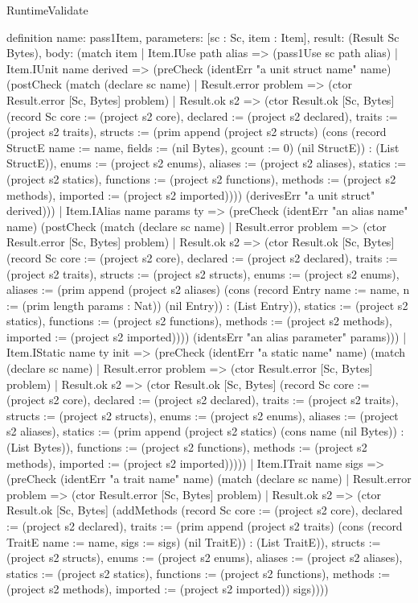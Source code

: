\begin{lexlean}{RuntimeValidate}
\begin{semanticmodule}
definition{
  name: pass1Item,
  parameters: [sc : Sc, item : Item],
  result: (Result Sc Bytes),
  body: (match item
    | Item.IUse path alias => (pass1Use sc path alias)
    | Item.IUnit name derived => (preCheck (identErr "a unit struct name" name) (postCheck (match (declare sc name)
      | Result.error problem => (ctor Result.error [Sc, Bytes] problem)
      | Result.ok s2 => (ctor Result.ok [Sc, Bytes] (record Sc {core := (project s2 core), declared := (project s2 declared), traits := (project s2 traits), structs := (prim append (project s2 structs) (cons (record StructE {name := name, fields := (nil Bytes), gcount := 0}) (nil StructE)) : (List StructE)), enums := (project s2 enums), aliases := (project s2 aliases), statics := (project s2 statics), functions := (project s2 functions), methods := (project s2 methods), imported := (project s2 imported)}))) (derivesErr "a unit struct" derived)))
    | Item.IAlias name params ty => (preCheck (identErr "an alias name" name) (postCheck (match (declare sc name)
      | Result.error problem => (ctor Result.error [Sc, Bytes] problem)
      | Result.ok s2 => (ctor Result.ok [Sc, Bytes] (record Sc {core := (project s2 core), declared := (project s2 declared), traits := (project s2 traits), structs := (project s2 structs), enums := (project s2 enums), aliases := (prim append (project s2 aliases) (cons (record Entry {name := name, n := (prim length params : Nat)}) (nil Entry)) : (List Entry)), statics := (project s2 statics), functions := (project s2 functions), methods := (project s2 methods), imported := (project s2 imported)}))) (identsErr "an alias parameter" params)))
    | Item.IStatic name ty init => (preCheck (identErr "a static name" name) (match (declare sc name)
      | Result.error problem => (ctor Result.error [Sc, Bytes] problem)
      | Result.ok s2 => (ctor Result.ok [Sc, Bytes] (record Sc {core := (project s2 core), declared := (project s2 declared), traits := (project s2 traits), structs := (project s2 structs), enums := (project s2 enums), aliases := (project s2 aliases), statics := (prim append (project s2 statics) (cons name (nil Bytes)) : (List Bytes)), functions := (project s2 functions), methods := (project s2 methods), imported := (project s2 imported)}))))
    | Item.ITrait name sigs => (preCheck (identErr "a trait name" name) (match (declare sc name)
      | Result.error problem => (ctor Result.error [Sc, Bytes] problem)
      | Result.ok s2 => (ctor Result.ok [Sc, Bytes] (addMethods (record Sc {core := (project s2 core), declared := (project s2 declared), traits := (prim append (project s2 traits) (cons (record TraitE {name := name, sigs := sigs}) (nil TraitE)) : (List TraitE)), structs := (project s2 structs), enums := (project s2 enums), aliases := (project s2 aliases), statics := (project s2 statics), functions := (project s2 functions), methods := (project s2 methods), imported := (project s2 imported)}) sigs))))
}
\end{semanticmodule}
\end{lexlean}
